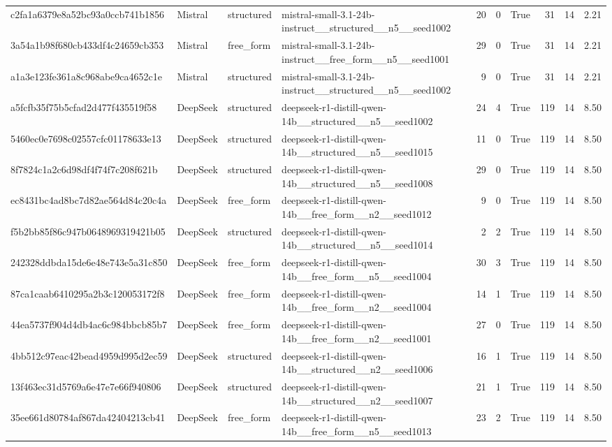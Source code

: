\begin{longtable}{llllrrrrrr}
c2fa1a6379e8a52bc93a0ccb741b1856 & Mistral & structured & mistral-small-3.1-24b-instruct\_\_structured\_\_n5\_\_seed1002 & 20 & 0 & True & 31 & 14 & 2.21 \\
3a54a1b98f680cb433df4c24659cb353 & Mistral & free\_form & mistral-small-3.1-24b-instruct\_\_free\_form\_\_n5\_\_seed1001 & 29 & 0 & True & 31 & 14 & 2.21 \\
a1a3e123fe361a8c968abe9ca4652c1e & Mistral & structured & mistral-small-3.1-24b-instruct\_\_structured\_\_n5\_\_seed1002 & 9 & 0 & True & 31 & 14 & 2.21 \\
a5fcfb35f75b5cfad2d477f435519f58 & DeepSeek & structured & deepseek-r1-distill-qwen-14b\_\_structured\_\_n5\_\_seed1002 & 24 & 4 & True & 119 & 14 & 8.50 \\
5460ec0e7698c02557cfc01178633e13 & DeepSeek & structured & deepseek-r1-distill-qwen-14b\_\_structured\_\_n5\_\_seed1015 & 11 & 0 & True & 119 & 14 & 8.50 \\
8f7824c1a2c6d98df4f74f7c208f621b & DeepSeek & structured & deepseek-r1-distill-qwen-14b\_\_structured\_\_n5\_\_seed1008 & 29 & 0 & True & 119 & 14 & 8.50 \\
ec8431bc4ad8bc7d82ae564d84c20c4a & DeepSeek & free\_form & deepseek-r1-distill-qwen-14b\_\_free\_form\_\_n2\_\_seed1012 & 9 & 0 & True & 119 & 14 & 8.50 \\
f5b2bb85f86c947b0648969319421b05 & DeepSeek & structured & deepseek-r1-distill-qwen-14b\_\_structured\_\_n5\_\_seed1014 & 2 & 2 & True & 119 & 14 & 8.50 \\
242328ddbda15de6e48e743e5a31c850 & DeepSeek & free\_form & deepseek-r1-distill-qwen-14b\_\_free\_form\_\_n5\_\_seed1004 & 30 & 3 & True & 119 & 14 & 8.50 \\
87ca1caab6410295a2b3c120053172f8 & DeepSeek & free\_form & deepseek-r1-distill-qwen-14b\_\_free\_form\_\_n2\_\_seed1004 & 14 & 1 & True & 119 & 14 & 8.50 \\
44ea5737f904d4db4ac6c984bbcb85b7 & DeepSeek & free\_form & deepseek-r1-distill-qwen-14b\_\_free\_form\_\_n2\_\_seed1001 & 27 & 0 & True & 119 & 14 & 8.50 \\
4bb512c97eac42bead4959d995d2ec59 & DeepSeek & structured & deepseek-r1-distill-qwen-14b\_\_structured\_\_n2\_\_seed1006 & 16 & 1 & True & 119 & 14 & 8.50 \\
13f463ec31d5769a6e47e7e66f940806 & DeepSeek & structured & deepseek-r1-distill-qwen-14b\_\_structured\_\_n2\_\_seed1007 & 21 & 1 & True & 119 & 14 & 8.50 \\
35ee661d80784af867da42404213cb41 & DeepSeek & free\_form & deepseek-r1-distill-qwen-14b\_\_free\_form\_\_n5\_\_seed1013 & 23 & 2 & True & 119 & 14 & 8.50 \\

\end{longtable}

